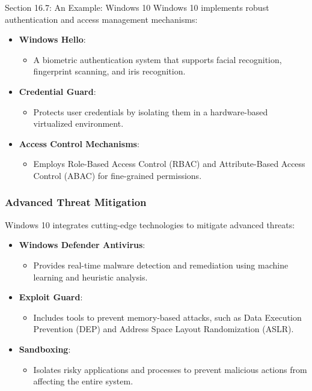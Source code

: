 \begin{notes}{Section 16.7: An Example: Windows 10}
    Windows 10 implements robust authentication and access management mechanisms:
    \begin{itemize}
        \item \textbf{Windows Hello}:
        \begin{itemize}
            \item A biometric authentication system that supports facial recognition, fingerprint scanning, and iris recognition.
        \end{itemize}
        \item \textbf{Credential Guard}:
        \begin{itemize}
            \item Protects user credentials by isolating them in a hardware-based virtualized environment.
        \end{itemize}
        \item \textbf{Access Control Mechanisms}:
        \begin{itemize}
            \item Employs Role-Based Access Control (RBAC) and Attribute-Based Access Control (ABAC) for fine-grained permissions.
        \end{itemize}
    \end{itemize}
    
    \subsubsection*{Advanced Threat Mitigation}
    
    Windows 10 integrates cutting-edge technologies to mitigate advanced threats:
    \begin{itemize}
        \item \textbf{Windows Defender Antivirus}:
        \begin{itemize}
            \item Provides real-time malware detection and remediation using machine learning and heuristic analysis.
        \end{itemize}
        \item \textbf{Exploit Guard}:
        \begin{itemize}
            \item Includes tools to prevent memory-based attacks, such as Data Execution Prevention (DEP) and Address Space Layout Randomization (ASLR).
        \end{itemize}
        \item \textbf{Sandboxing}:
        \begin{itemize}
            \item Isolates risky applications and processes to prevent malicious actions from affecting the entire system.
        \end{itemize}
    \end{itemize}
    

\end{notes}
